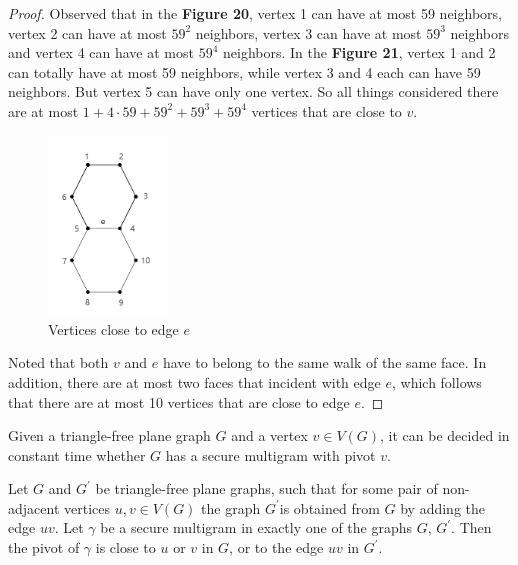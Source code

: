 \begin{proof}
    Observed that in the \textbf{Figure 20}, vertex 1 can have at most 59 neighbors, vertex 2 can have at most $59^{2}$ neighbors, vertex 3 can have at most $59^{3}$ neighbors and vertex 4 can have at most $59^{4}$ neighbors. In the \textbf{Figure 21}, vertex 1 and 2 can totally have at most 59 neighbors, while vertex 3 and 4 each can have 59 neighbors. But vertex 5 can have only one vertex. So all things considered there are at most $1 + 4 \cdot 59 + 59^{2} + 59^{3} + 59^{4}$ vertices that are close to $v$.
    \begin{figure}[H] %
    \centering %
    \includegraphics[width=0.28\textwidth]{figure/593.png} 
    \caption{Vertices close to edge $e$} %
    \label{figure} %
    \end{figure}
    Noted that both $v$ and $e$ have to belong to the same walk of the same face. In addition, there are at most two faces that incident with edge $e$, which follows that there are at most 10 vertices that are close to edge $e$.
\end{proof}

\begin{lemma}
Given a triangle-free plane graph $G$ and a vertex $v \in V(G)$, it can be decided in constant time whether $G$ has a secure multigram with pivot $v$.\cite{dvorak2013threecoloring}
\end{lemma}

\begin{lemma}
Let $G$ and $G^{'}$ be triangle-free plane graphs, such that for some pair of non-adjacent vertices $u, v \in V(G)$ the graph $G^{'}$is obtained from $G$ by adding the edge $uv$. Let $\gamma$ be a secure multigram in exactly one of the graphs $G$, $G^{'}$. Then the pivot of $\gamma$ is close to $u$ or $v$ in $G$, or to the edge $uv$ in $G^{'}$.\cite{dvorak2013threecoloring}
\end{lemma}

